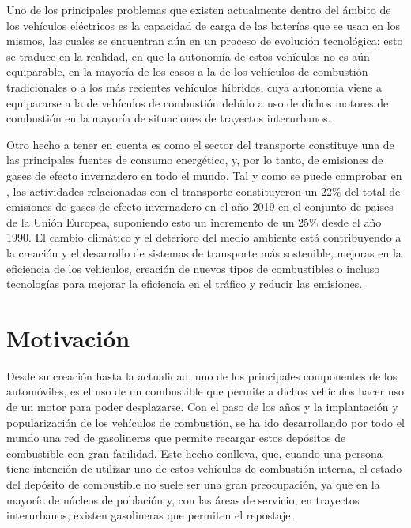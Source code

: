 \documentclass[11pt,spanish,listoffigures,listoftables]{tfgetsinf}
\begin{document}
Uno de los principales problemas que existen actualmente dentro del ámbito de los vehículos eléctricos es la capacidad de carga de las baterías que se usan en los mismos, las cuales se encuentran aún en un proceso de evolución tecnológica; esto se traduce en la realidad, en que la autonomía de estos vehículos no es aún equiparable, en la mayoría de los casos a la de los vehículos de combustión tradicionales o a los más recientes vehículos híbridos, cuya autonomía viene a equipararse a la de vehículos de combustión debido a uso de dichos motores de combustión en la mayoría de situaciones de trayectos interurbanos.

Otro hecho a tener en cuenta es como el sector del transporte constituye una de las principales fuentes de consumo energético, y, por lo tanto, de emisiones de gases de efecto invernadero en todo el mundo. Tal y como se puede comprobar en \cite{EEAPUBL2021066}, las actividades relacionadas con el transporte constituyeron un 22\% del total de emisiones de gases de efecto invernadero en el año 2019 en el conjunto de países de la Unión Europea, suponiendo esto un incremento de un 25\% desde el año 1990. El cambio climático y el deterioro del medio ambiente está contribuyendo a la creación y el desarrollo de sistemas de transporte más sostenible, mejoras en la eficiencia de los vehículos, creación de nuevos tipos de combustibles o incluso tecnologías para mejorar la eficiencia en el tráfico y reducir las emisiones.

\section{Motivación}
Desde su creación hasta la actualidad, uno de los principales componentes de los automóviles, es el uso de un combustible que permite a dichos vehículos hacer uso de un motor para poder desplazarse. Con el paso de los años y la implantación y popularización de los vehículos de combustión, se ha ido desarrollando por todo el mundo una red de gasolineras que permite recargar estos depósitos de combustible con gran facilidad. Este hecho conlleva, que, cuando una persona tiene intención de utilizar uno de estos vehículos de combustión interna, el estado del depósito de combustible no suele ser una gran preocupación, ya que en la mayoría de núcleos de población y, con las áreas de servicio, en trayectos interurbanos, existen gasolineras que permiten el repostaje.
\end{document}
